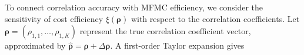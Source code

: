 To connect correlation accuracy with MFMC efficiency, we consider the sensitivity of cost efficiency $\xi(\boldsymbol{\rho})$ with respect to the correlation coefficients. Let  $\boldsymbol{\rho} = (\rho_{1,1},\ldots, \rho_{1,K})$ represent the true correlation coefficient vector, approximated by $\widehat {\boldsymbol{\rho}}  = \boldsymbol{\rho}+\Delta \boldsymbol{\rho}$. A first-order Taylor expansion gives

%



